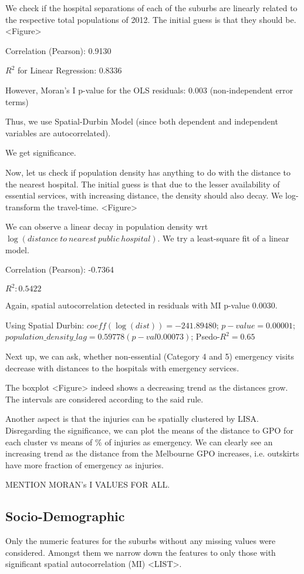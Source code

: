 \documentclass[
	a4paper, %
	10pt, %
	unnumberedsections, %
	twoside, %
]{LTJournalArticle}
\begin{document}
We check if the hospital separations of each of the suburbs are linearly related to the respective total populations of 2012. The initial guess is that they should be. <Figure>

Correlation (Pearson): 0.9130

$R^2$ for Linear Regression: 0.8336

However, Moran's I p-value for the OLS residuals: 0.003 (non-independent error terms)

Thus, we use Spatial-Durbin Model (since both dependent and independent variables are autocorrelated). 

We get significance.

Now, let us check if population density has anything to do with the distance to the nearest hospital. The initial guess is that due to the lesser availability of essential services, with increasing distance, the density should also decay. We log-transform the travel-time. <Figure>

We can observe a linear decay in population density wrt $\log(distance \ to \ nearest \ public \ hospital)$. We try a least-square fit of a linear model. 

Correlation (Pearson): -0.7364

$R^2: 0.5422$

Again, spatial autocorrelation detected in residuals with MI p-value 0.0030.

Using Spatial Durbin: $coeff(\log(dist))=-241.89480$; $p-value=0.00001$; $population\_density\_lag= 0.59778 (p-val 0.00073)$; Psedo-$R^2=0.65$

Next up, we can ask, whether non-essential (Category 4 and 5) emergency visits decrease with distances to the hospitals with emergency services.

The boxplot <Figure> indeed shows a decreasing trend as the distances grow. The intervals are considered according to the said rule.


Another aspect is that the injuries can be spatially clustered by LISA. Disregarding the significance, we can plot the means of the distance to GPO for each cluster vs means of \% of injuries as emergency. We can clearly see an increasing trend as the distance from the Melbourne GPO increases, i.e. outskirts have more fraction of emergency as injuries.



MENTION MORAN's I VALUES FOR ALL.

\subsection{Socio-Demographic}
Only the numeric features for the suburbs without any missing values were considered. Amongst them we narrow down the features to only those with significant spatial autocorrelation (MI) <LIST>. 
\end{document}
